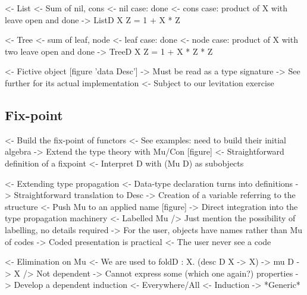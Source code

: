 \documentclass{article}
\newenvironment{structure}{\footnotesize\verbatim}{\endverbatim}
\begin{document}
\begin{structure}
<- List
    <- Sum of nil, cons
    <- nil case: done
    <- cons case: product of X with leave open and done
    -> ListD X Z = 1 + X * Z
\end{structure}

\begin{structure}
<- Tree
    <- sum of leaf, node
    <- leaf case: done
    <- node case: product of X with two leave open and done
    -> TreeD X Z = 1 + X * Z * Z
\end{structure}

\begin{structure}
<- Fictive object [figure 'data Desc']
    -> Must be read as a type signature
    -> See further for its actual implementation
        <- Subject to our levitation exercise
\end{structure}

\subsection{Fix-point}

\begin{structure}
<- Build the fix-point of functors
    <- See examples: need to build their initial algebra
    -> Extend the type theory with Mu/Con [figure]
        <- Straightforward definition of a fixpoint
            <- Interpret D with (Mu D) as subobjects
\end{structure}

\begin{structure}
<- Extending type propagation
    <- Data-type declaration turns into definitions
        -> Straightforward translation to Desc
        -> Creation of a variable referring to the structure
    <- Push Mu to an applied name [figure]
        -> Direct integration into the type propagation machinery
    <- Labelled Mu
        /> Just mention the possibility of labelling, no details required
        -> For the user, objects have names rather than Mu of codes
    -> Coded presentation is practical
        <- The user never see a code
\end{structure}

\begin{structure}
<- Elimination on Mu
    <- We are used to foldD : \forall X. (desc D X -> X) -> mu D -> X
        /> Not dependent
        -> Cannot express some (which one again?) properties
    -> Develop a dependent induction
        <- Everywhere/All
        <- Induction
    -> *Generic*
\end{structure}
\end{document}
